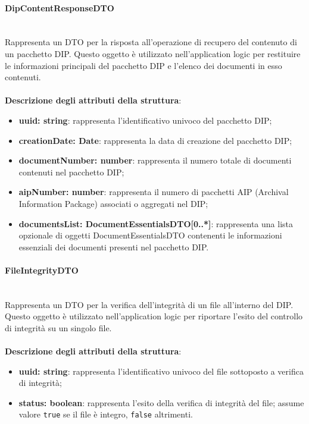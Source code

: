 \documentclass[a4paper,12pt]{article}
\begin{document}
{{{                \paragraph{DipContentResponseDTO}\label{par:DipContentResponseDTO}\mbox{}\\
                Rappresenta un DTO per la risposta all'operazione di recupero del contenuto di un pacchetto DIP. Questo oggetto è utilizzato nell'application logic per restituire le informazioni principali del pacchetto DIP e l'elenco dei documenti in esso contenuti.\\
                \\
                \textbf{Descrizione degli attributi della struttura}:
                \begin{itemize}
                    \item \textbf{uuid: string}: rappresenta l'identificativo univoco del pacchetto DIP;
                    \item \textbf{creationDate: Date}: rappresenta la data di creazione del pacchetto DIP;
                    \item \textbf{documentNumber: number}: rappresenta il numero totale di documenti contenuti nel pacchetto DIP;
                    \item \textbf{aipNumber: number}: rappresenta il numero di pacchetti AIP (Archival Information Package) associati o aggregati nel DIP;
                    \item \textbf{documentsList: DocumentEssentialsDTO[0..*]}: rappresenta una lista opzionale di oggetti DocumentEssentialsDTO contenenti le informazioni essenziali dei documenti presenti nel pacchetto DIP.
                \end{itemize}

                \paragraph{FileIntegrityDTO}\label{par:FileIntegrityDTO}\mbox{}\\
                Rappresenta un DTO per la verifica dell'integrità di un file all'interno del DIP. Questo oggetto è utilizzato nell'application logic per riportare l'esito del controllo di integrità su un singolo file.\\
                \\
                \textbf{Descrizione degli attributi della struttura}:
                \begin{itemize}
                    \item \textbf{uuid: string}: rappresenta l'identificativo univoco del file sottoposto a verifica di integrità;
                    \item \textbf{status: boolean}: rappresenta l'esito della verifica di integrità del file; assume valore \texttt{true} se il file è integro, \texttt{false} altrimenti.
                \end{itemize}
}}}
\end{document}
